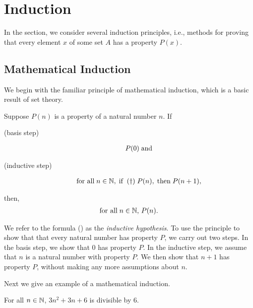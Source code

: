 \section{Induction}
\label{Induction}

%
In the section, we consider several induction principles, i.e.,
methods for proving that every element $x$ of some set $A$ has a
property $P(x)$.

\subsection{Mathematical Induction}

We begin with the familiar principle of mathematical induction,
which is a basic result of set theory.

%
%
\begin{theorem}
Suppose $P(n)$ is a property of a natural number $n$.
If
\begin{description}
\item[\quad(basis step)]
\begin{gather*}
P(0) \;\allowbreak\mbox{and}\allowbreak
\end{gather*}
\item[\quad(inductive step)]
\begin{gather*}
\allowbreak\mbox{for all}\allowbreak\;n\in\mathbb{N},
\;\allowbreak\mbox{if}\allowbreak\;\;\allowbreak\mbox{\rm(\dag)}\allowbreak\; P(n),\;\allowbreak\mbox{then}\allowbreak\;P(n+1),
\end{gather*}
\end{description}
then,
\begin{gather*}
\allowbreak\mbox{for all}\allowbreak\;n\in\mathbb{N},\,P(n) .
\end{gather*}
\end{theorem}

We refer to the formula (\dag) as the \emph{inductive hypothesis}.
%
%
To use the principle to show that that every natural
number has property $P$, we carry out two steps.  In the basis step,
we show that $0$ has property $P$.  In the inductive step, we
assume that $n$ is a natural number with property $P$.  We then show
that $n+1$ has property $P$, without making any more assumptions about
$n$.

Next we give an example of a mathematical induction.

\begin{proposition}
\label{MathIndExamp}
For all $n\in\mathbb{N}$, $3n^2 + 3n + 6$ is divisible by $6$.
\end{proposition}

